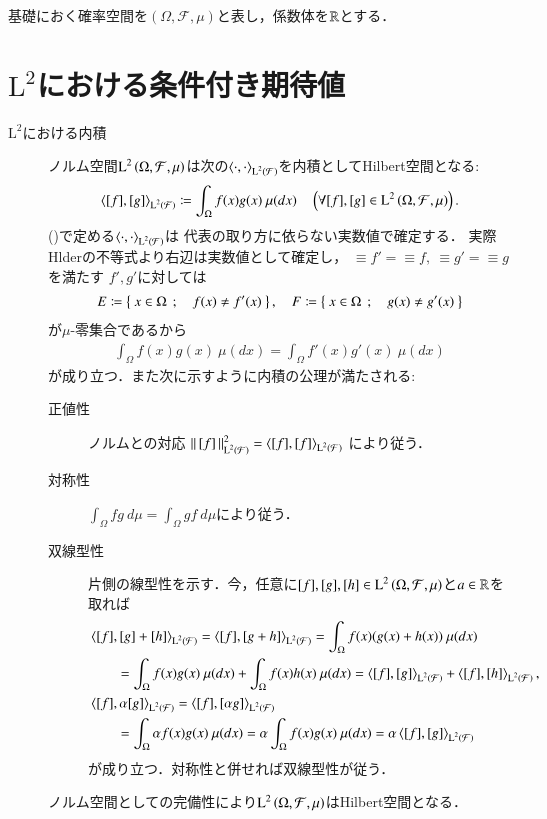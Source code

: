 基礎におく確率空間を$(\Omega,\mathcal{F},\mu)$と表し，係数体を$\mathbb{R}$とする．

\section{$\mathrm{L}^2$における条件付き期待値}
	\begin{description}
	\item[$\mathrm{L}^2$における内積]
		ノルム空間$\operatorname{L}^{2} \left(\Omega,\mathcal{F},\mu\right)$は次の$\inprod<\cdot,\cdot>_{\Lp{2}{\mathcal{F}}}$を内積としてHilbert空間となる:
		\begin{align}
			\inprod<[f],[g]>_{\Lp{2}{\mathcal{F}}} \coloneqq \int_{\Omega} f(x)g(x)\ \mu(dx) \quad \left(\forall [f],[g] \in \Lp{2}{\Omega,\mathcal{F},\mu} \right).
			\label{eq:L2_inner_product}
		\end{align}
		()で定める$\inprod<\cdot,\cdot>_{\Lp{2}{\mathcal{F}}}$は
		代表の取り方に依らない実数値で確定する．
		実際Hlderの不等式より右辺は実数値として確定し，
		$\equiv{f'}{} = \equiv{f}{},\ \equiv{g'}{} = \equiv{g}{}$を満たす
		$f',g'$に対しては
		\begin{align}
			E \coloneqq \left\{\ x \in \Omega\ \, ; \quad f(x) \neq f'(x)\ \right\}, \quad
			F \coloneqq \left\{\ x \in \Omega\ \, ; \quad g(x) \neq g'(x)\ \right\}
		\end{align}
		が$\mu$-零集合であるから
		\begin{align}
			\int_{\Omega} f(x)g(x)\ \mu(dx) = \int_{\Omega} f'(x)g'(x)\ \mu(dx)
		\end{align}
		が成り立つ．また次に示すように内積の公理が満たされる:
		\begin{description}
			\item[正値性] 
				ノルムとの対応
				$\Norm{[f]}{\Lp{2}{\mathcal{F}}}^2 = \inprod<[f],[f]>_{\Lp{2}{\mathcal{F}}}$
				により従う．
			\item[対称性] 
				$\int_\Omega fg\ d\mu = \int_\Omega gf\ d\mu$により従う．
			\item[双線型性] 
				片側の線型性を示す．今，任意に$[f],[g],[h] \in \operatorname{L}^{2} \left(\Omega,\mathcal{F},\mu\right)$と$a \in \mathbb{R}$を取れば
				\begin{align}
					&\inprod<[f],[g] + [h]>_{\Lp{2}{\mathcal{F}}} 
					= \inprod<[f],[g + h]>_{\Lp{2}{\mathcal{F}}}
					= \int_{\Omega} f(x)(g(x) + h(x))\ \mu(dx) \\
					&\qquad= \int_{\Omega} f(x)g(x)\ \mu(dx) + \int_{\Omega} f(x)h(x)\ \mu(dx)
					= \inprod<[f],[g]>_{\Lp{2}{\mathcal{F}}} + \inprod<[f],[h]>_{\Lp{2}{\mathcal{F}}}, \\
					&\inprod<[f],\alpha [g]>_{\Lp{2}{\mathcal{F}}} 
						= \inprod<[f],[\alpha g]>_{\Lp{2}{\mathcal{F}}} \\
					&\qquad= \int_{\Omega} \alpha f(x)g(x)\ \mu(dx)
					= \alpha \int_{\Omega} f(x)g(x)\ \mu(dx)
					= \alpha \inprod<[f],[g]>_{\Lp{2}{\mathcal{F}}}
				\end{align}
				が成り立つ．対称性と併せれば双線型性が従う．
		\end{description}
		ノルム空間としての完備性により$\operatorname{L}^{2} \left(\Omega,\mathcal{F},\mu\right)$はHilbert空間となる．
	

\end{description}
